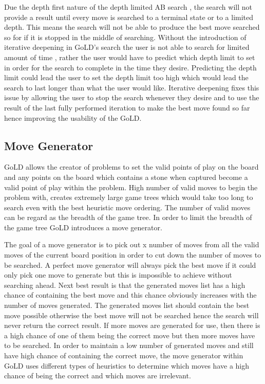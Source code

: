 \documentclass{l4proj}
\begin{document}
Due the depth first nature of the depth limited AB search , the search will not provide a result until every move is searched to a terminal state or to a limited depth. This means the search will not be able to produce the best move searched so for if it is stopped in the middle of searching. Without the introduction of iterative deepening in GoLD’s search the user is not able to search for limited amount of time , rather the user would have to predict which depth limit to set in order for the search to complete in the time they desire.  Predicting the depth limit could lead the user to set the depth limit too high which would lead the search to last longer than what the user would like. Iterative deepening fixes this issue by allowing the user to stop the search whenever they desire and to use the result of the last fully performed iteration to make the best move found so far hence improving the usability of the GoLD.

\subsection{Move Generator}
GoLD allows the creator of problems to set the valid points of play on the board and any points on the board which contains a stone when captured become a valid point of play within the problem. High number of valid moves to begin the problem with, creates extremely large game trees which would take too long to search even with the best heuristic move ordering. The number of valid moves can be regard as the breadth of the game tree. In order to limit the breadth of the game tree GoLD introduces a move generator.

The goal of a move generator is to pick out x number of moves from all the valid moves of the current board position in order to cut down the number of moves to be searched. A perfect move generator will always pick the best move if it could only pick one move to generate but this is impossible to achieve without searching ahead.  Next best result is that the generated moves list has a high chance of containing the best move and this chance obviously increases with the number of moves generated. The generated moves list should contain the best move possible otherwise the best move will not be searched hence the search will never return the correct result. If more moves are generated for use, then there is a high chance of one of them being the correct move but then more moves have to be searched. In order to maintain a low number of generated moves and still have high chance of containing the correct move, the move generator within GoLD uses different types of heuristics to determine which moves have a high chance of being the correct and which moves are irrelevant.
\end{document}

